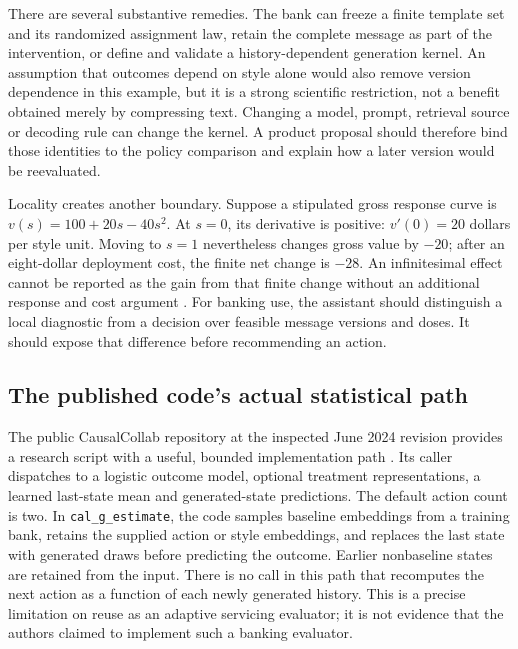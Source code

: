 There are several substantive remedies. The bank can freeze a finite
template set and its randomized assignment law, retain the complete
message as part of the intervention, or define and validate a
history-dependent generation kernel. An assumption that outcomes depend
on style alone would also remove version dependence in this example,
but it is a strong scientific restriction, not a benefit obtained merely
by compressing text. Changing a model, prompt, retrieval source or
decoding rule can change the kernel. A product proposal should therefore
bind those identities to the policy comparison and explain how a later
version would be reevaluated.

Locality creates another boundary. Suppose a stipulated gross response
curve is $v(s)=100+20s-40s^2$. At $s=0$, its derivative is positive:
$v'(0)=20$ dollars per style unit. Moving to $s=1$ nevertheless changes
gross value by $-20$; after an eight-dollar deployment cost, the finite
net change is $-28$.
An infinitesimal effect cannot be reported as the gain from that finite
change without an additional response and cost argument
\citep{exec16_longpolicy_oracle}. For banking use, the assistant should
distinguish a local diagnostic from a decision over feasible message
versions and doses. It should expose that difference before recommending
an action.

\subsection{The published code's actual statistical path}

The public CausalCollab repository at the inspected June 2024 revision
provides a research script with a useful, bounded implementation path
\citep{exec16_longpolicy_code}. Its caller dispatches to a logistic outcome
model, optional treatment representations, a learned last-state mean and
generated-state predictions. The default action count is two.
In \texttt{cal\_g\_estimate}, the code samples baseline embeddings from a
training bank, retains the supplied action or style embeddings, and
replaces the last state with generated draws before predicting the
outcome. Earlier nonbaseline states are retained from the input.
There is no call in this path that recomputes the next action as a function
of each newly generated history. This is a precise limitation on reuse
as an adaptive servicing evaluator; it is not evidence that the authors
claimed to implement such a banking evaluator.

